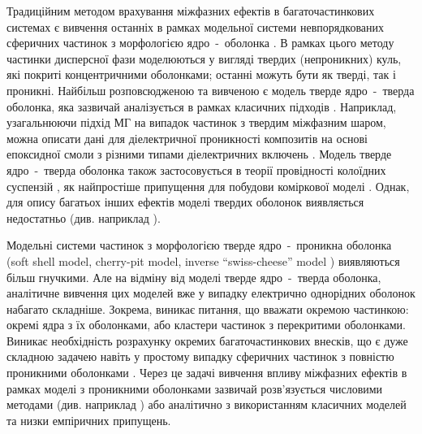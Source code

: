 \documentclass[14pt,twoside]{vakthesis}
\begin{document}
Традиційним методом врахування міжфазних ефектів в багаточастинкових системах є вивчення останніх в рамках модельної системи невпорядкованих сферичних частинок з морфологією ядро~-~оболонка \cite{Torquato, Choy}. В рамках цього методу частинки дисперсної фази моделюються у вигляді твердих (непроникних) куль, які покриті концентричними оболонками; останні можуть бути як тверді, так і проникні.
Найбільш розповсюдженою та вивченою є модель тверде ядро~-~тверда оболонка, яка зазвичай аналізується в рамках класичних підходів \cite{Choy,Sihvola1999}. Наприклад, узагальнюючи підхід МГ на випадок частинок з твердим міжфазним шаром, можна описати дані для діелектричної проникності композитів на основі епоксидної смоли з різними типами діелектричних включень \cite{Vo2002}. 
Модель тверде ядро~-~тверда оболонка також застосовується в теорії провідності колоїдних суспензій \cite{Ohshima1982,Lyklema1995}, як найпростіше припущення для побудови коміркової моделі \cite{Lyklema1995,Torquato}.
Однак, для опису багатьох інших ефектів моделі твердих оболонок виявляється недостатньо (див. наприклад \cite{Wiec1994,  Tomylko2015, Singh2018}). 


Модельні системи частинок з морфологією тверде ядро~-~проникна оболонка (soft shell model, cherry-pit model, inverse ``swiss-cheese'' model \cite{Torquato}) виявляються більш гнучкими.
Але на відміну від моделі тверде ядро~-~тверда оболонка, аналітичне вивчення цих моделей вже у випадку електрично однорідних оболонок набагато складніше. Зокрема, виникає питання, що вважати окремою частинкою: окремі ядра з їх оболонками, або кластери частинок з перекритими оболонками. Виникає необхідність розрахунку окремих багаточастинкових внесків, що є дуже складною задачею навіть у простому випадку сферичних частинок з повністю проникними оболонками \cite{Torquato}. 
Через це задачі вивчення впливу міжфазних ефектів в рамках моделі з проникними оболонками зазвичай розв'язується числовими методами (див. наприклад \cite{Myroshnychenko2008,Myroshnychenko2009}) або аналітично з використанням класичних моделей та низки емпіричних припущень.
\end{document}
